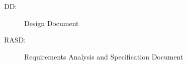 \begin{description}
\item[DD:] Design Document
\item[RASD:] Requirements Analysis and Specification Document
\end{description}